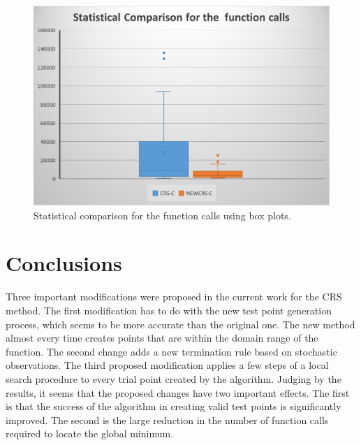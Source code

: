 \documentclass[symmetry,article,submit,moreauthors,pdftex]{Definitions/mdpi}
\begin{document}
\begin{figure}
\caption{Statistical comparison for the function calls using box plots.\\ \label{fig:Statistical-comparison-for}}

\begin{centering}
\includegraphics[scale=0.7]{values}
\par\end{centering}
\end{figure}


\section{Conclusions \label{sec:Conclusions}}

Three important modifications were proposed in the current work for
the CRS method. The first modification has to do with the new test
point generation process, which seems to be more accurate than the
original one. The new method almost every time creates points that
are within the domain range of the function. The second change adds
a new termination rule based on stochastic observations. The third
proposed modification applies a few steps of a local search procedure
to every trial point created by the algorithm. Judging by the results,
it seems that the proposed changes have two important effects. The
first is that the success of the algorithm in creating valid test
points is significantly improved. The second is the large reduction
in the number of function calls required to locate the global minimum. 
\end{document}
